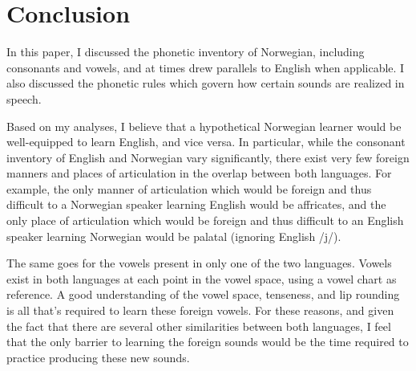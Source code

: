 \documentclass{article}
\begin{document}
\section{Conclusion}
In this paper, I discussed the phonetic inventory of Norwegian, including consonants and vowels, and at times drew parallels to English when applicable. I also discussed the phonetic rules which govern how certain sounds are realized in speech.  

Based on my analyses, I believe that a hypothetical Norwegian learner would be well-equipped to learn English, and vice versa. In particular, while the consonant inventory of English and Norwegian vary significantly, there exist very few foreign manners and places of articulation in the overlap between both languages. For example, the only manner of articulation which would be foreign and thus difficult to a Norwegian speaker learning English would be affricates, and the only place of articulation which would be foreign and thus difficult to an English speaker learning Norwegian would be palatal (ignoring English /j/).  

The same goes for the vowels present in only one of the two languages. Vowels exist in both languages at each point in the vowel space, using a vowel chart as reference. A good understanding of the vowel space, tenseness, and lip rounding is all that's required to learn these foreign vowels. For these reasons, and given the fact that there are several other similarities between both languages, I feel that the only barrier to learning the foreign sounds would be the time required to practice producing these new sounds.


\printbibliography
\end{document}
